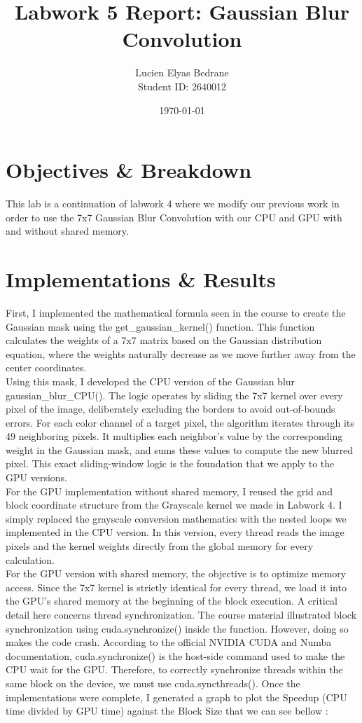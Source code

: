 \documentclass[11pt, a4paper]{article}
\title{\textbf{Labwork 5 Report: Gaussian Blur Convolution}}
\author{Lucien Elyas Bedrane \\ Student ID: 2640012}
\date{\today}
\begin{document}
\maketitle

\section{Objectives \& Breakdown}
This lab is a continuation of labwork 4 where we modify our previous work in order to use the 7x7 Gaussian Blur Convolution with our CPU and GPU with and without shared memory.

\section{Implementations \& Results}
First, I implemented the mathematical formula seen in the course to create the Gaussian mask using the get\_gaussian\_kernel() function. This function calculates the weights of a 7x7 matrix based on the Gaussian distribution equation, where the weights naturally decrease as we move further away from the center coordinates.
\\Using this mask, I developed the CPU version of the Gaussian blur gaussian\_blur\_CPU(). The logic operates by sliding the 7x7 kernel over every pixel of the image, deliberately excluding the borders to avoid out-of-bounds errors. For each color channel of a target pixel, the algorithm iterates through its 49 neighboring pixels. It multiplies each neighbor's value by the corresponding weight in the Gaussian mask, and sums these values to compute the new blurred pixel. This exact sliding-window logic is the foundation that we apply to the GPU versions.
\\For the GPU implementation without shared memory, I reused the grid and block coordinate structure from the Grayscale kernel we made in Labwork 4. I simply replaced the grayscale conversion mathematics with the nested loops we implemented in the CPU version. In this version, every thread reads the image pixels and the kernel weights directly from the global memory for every calculation.
\\For the GPU version with shared memory, the objective is to optimize memory access. Since the 7x7 kernel is strictly identical for every thread, we load it into the GPU's shared memory at the beginning of the block execution. A critical detail here concerns thread synchronization. The course material illustrated block synchronization using cuda.synchronize() inside the function. However, doing so makes the code crash. According to the official NVIDIA CUDA and Numba documentation, cuda.synchronize() is the host-side command used to make the CPU wait for the GPU. Therefore, to correctly synchronize threads within the same block on the device, we must use cuda.syncthreads().
\clearpage
Once the implementations were complete, I generated a graph to plot the Speedup (CPU time divided by GPU time) against the Block Size that we can see bellow :
 
\end{document}
